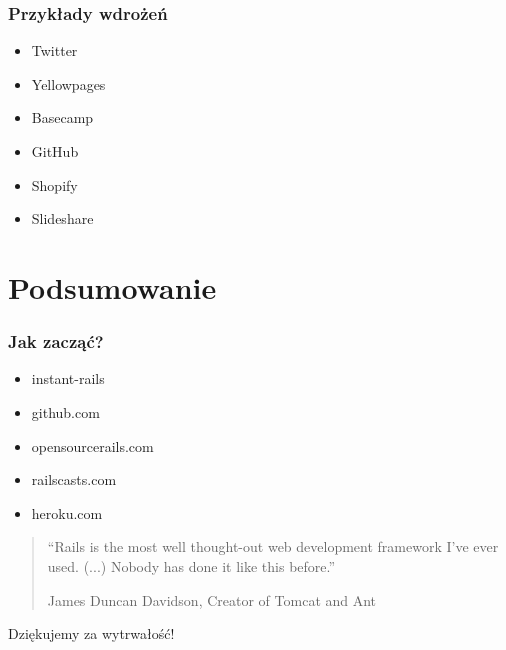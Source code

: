 \documentclass[12t]{beamer}
\begin{document}
\begin{frame}
  \frametitle{Przykłady wdrożeń}
  \begin{itemize}
  \item Twitter
  \item Yellowpages
  \item Basecamp
  \item GitHub
  \item Shopify
  \item Slideshare
  \end{itemize}
\end{frame}

\section{Podsumowanie}
\begin{frame}
  \frametitle{Jak zacząć?}
  \begin{itemize}
  \item instant-rails
  \item github.com
  \item opensourcerails.com
  \item railscasts.com
  \item heroku.com
  \end{itemize}
\end{frame}

\begin{frame}
  \begin{quote}
    “Rails is the most well thought-out web development framework I've
    ever used. (...) Nobody has done it like this before.”

    \begin{small}
      \hfill James Duncan Davidson, Creator of Tomcat and Ant
    \end{small}
  \end{quote}
\end{frame}

\begin{frame}
  \begin{center}
    \begin{Large}
      Dziękujemy za wytrwałość!
    \end{Large}
  \end{center}
\end{frame}
\end{document}
